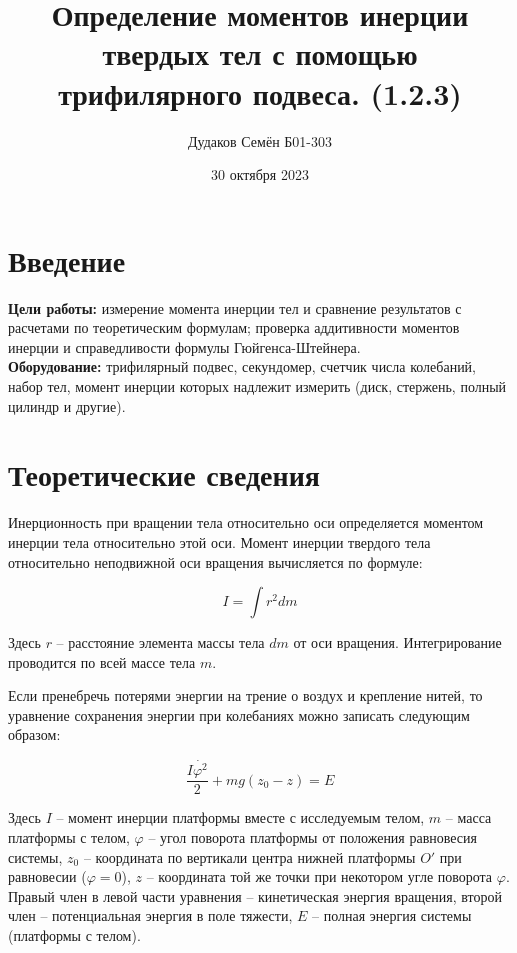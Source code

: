 \documentclass[a4, 12pt]{article}
\title{\textbf{Определение моментов инерции твердых тел с помощью трифилярного подвеса. (1.2.3)}}
\author{Дудаков Семён Б01-303}
\date{30 октября 2023}
\begin{document}
	\maketitle

	\section{Введение}

	\textbf{Цели работы:} измерение момента инерции тел и сравнение результатов с расчетами по теоретическим формулам; проверка аддитивности моментов инерции и справедливости формулы Гюйгенса-Штейнера.\\
	\textbf{Оборудование:} трифилярный подвес, секундомер, счетчик числа колебаний, набор тел, момент инерции которых надлежит измерить (диск, стержень, полный цилиндр и другие).
	\section{Теоретические сведения}

	\par Инерционность при вращении тела относительно оси определяется моментом инерции тела относительно этой оси. Момент инерции твердого тела относительно неподвижной оси вращения вычисляется по формуле:

	\begin{equation}
		I = \int r^2 dm
	\end{equation}

	Здесь $r$ -- расстояние элемента массы тела $dm$ от оси вращения. Интегрирование проводится по всей массе тела $m$.

	Если пренебречь потерями энергии на трение о воздух и крепление нитей, то уравнение сохранения энергии при колебаниях можно записать следующим образом:

	\begin{equation}\label{moment}
		\frac{I \dot{\varphi^2}}{2} + mg(z_0-z) = E
	\end{equation}

	Здесь $I$ -- момент инерции платформы вместе с исследуемым телом, $m$ -- масса платформы с телом, $\varphi$ -- угол поворота платформы от положения равновесия системы, $z_0$ -- координата по вертикали центра нижней платформы $O'$  при равновесии ($\varphi = 0$), $z$ -- координата той же точки при некотором угле поворота $\varphi$. Правый член в левой части уравнения -- кинетическая энергия вращения, второй член -- потенциальная энергия в поле тяжести, $E$ -- полная энергия системы (платформы с телом).
\end{document}

